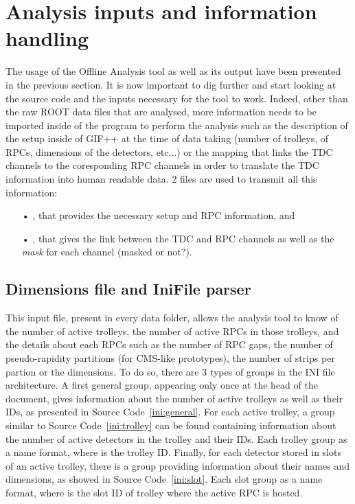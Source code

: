 \section{Analysis inputs and information handling}
\label{app2:sec:inputs}
	
	The usage of the Offline Analysis tool as well as its output have been presented in the previous section. It is now important to dig further and start looking at the source code and the inputs necessary for the tool to work. Indeed, other than the raw ROOT data files that are analysed, more information needs to be imported inside of the program to perform the analysis such as the description of the setup inside of GIF++ at the time of data taking (number of trolleys, of RPCs, dimensions of the detectors, etc...) or the mapping that links the TDC channels to the coresponding RPC channels in order to translate the TDC information into human readable data. 2 files are used to transmit all this information:\\
	
	\begin{itemize}
		\item[•] , that provides the necessary setup and RPC information, and
		\item[•] , that gives the link between the TDC and RPC channels as well as the \textit{mask} for each channel (masked or not?).
	\end{itemize}
	
	\subsection{Dimensions file and IniFile parser}
	\label{app2:ssec:dimensions}
	
	This input file, present in every data folder, allows the analysis tool to know of the number of active trolleys, the number of active RPCs in those trolleys, and the details about each RPCs such as the number of RPC gaps, the number of pseudo-rapidity partitions (for CMS-like prototypes), the number of strips per partion or the dimensions. To do so, there are 3 types of groups in the INI file architecture. A first general group, appearing only once at the head of the document, gives information about the number of active trolleys as well as their IDs, as presented in Source Code~\ref{ini:general}. For each active trolley, a group similar to Source Code~\ref{ini:trolley} can be found containing information about the number of active detectors in the trolley and their IDs. Each trolley group as a  name format, where  is the trolley ID. Finally, for each detector stored in slots of an active trolley, there is a group providing information about their names and dimensions, as showed in Source Code~\ref{ini:slot}. Each slot group as a  name format, where  is the slot ID of trolley  where the active RPC is hosted.\\
	
